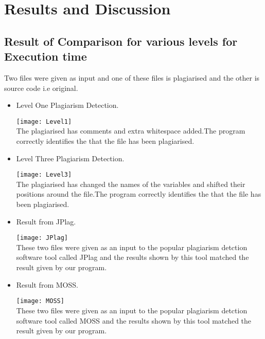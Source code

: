 \chapter{Results and Discussion }

\section{Result of Comparison for various levels for Execution time}

Two files were given as input and one of these files is plagiarised and the other is source code i.e original.

\begin{itemize}
\item Level One Plagiarism Detection.

  \texttt{[image: Level1]}
  \label{fig:Level1}\\
  The plagiarised has comments and extra whitespace added.The program correctly identifies the that the file has been plagiarised.
   

\item Level Three Plagiarism Detection.

  \texttt{[image: Level3]}
  \label{fig:Level3}\\
  The plagiarised has changed the names of the variables and shifted their positions around the file.The program correctly identifies the that the file has been plagiarised.
  
\item Result from JPlag.

  \texttt{[image: JPlag]}
  \label{fig:JPlag}\\
  These two files were given as an input to the popular plagiarism detction software tool called JPlag and the results shown by this tool matched the result given by our program.
   
  
\item Result from MOSS.



  \texttt{[image: MOSS]}
  \label{fig:MOSS}\\
  
These two files were given as an input to the popular plagiarism detction software tool called MOSS and the results shown by this tool matched the result given by our program.

\end{itemize}
